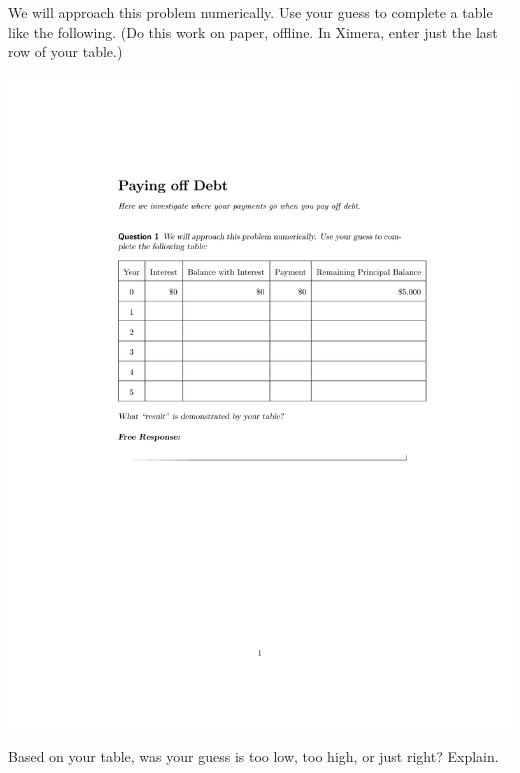 \documentclass[handout,space,nooutcomes]{ximera}
\begin{document}
\begin{question}[0in]
We will approach this problem numerically.  Use your guess to complete a table like the following.  (Do this work on paper, offline.  In Ximera, enter just the last row of your table.)  

\includegraphics{payingOffDebtTableGraphic.pdf}
 
\begin{freeResponse}
\end{freeResponse}
\end{question}

\begin{question}
Based on your table, was your guess is too low, too high, or just right?  Explain.  
\begin{freeResponse}
\end{freeResponse}
\end{question}
\end{document}
